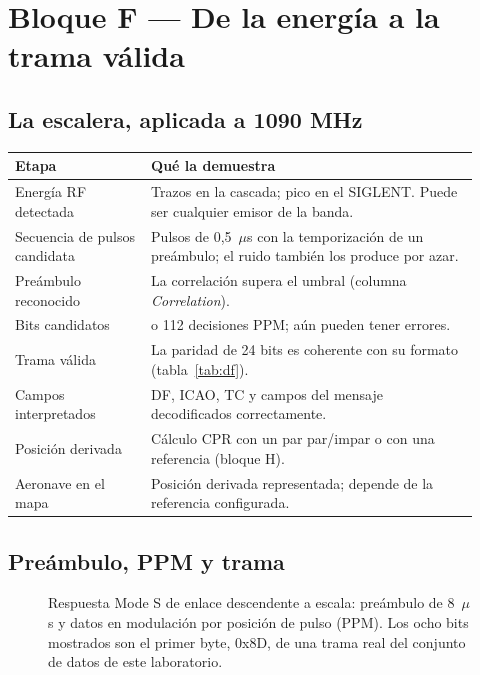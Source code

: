\section{Bloque F --- De la energía a la trama válida}
\label{sec:u-tramas}

\subsection{La escalera, aplicada a 1090 MHz}

\begin{longtable}{@{}>{\raggedright\arraybackslash}p{0.27\linewidth}>{\raggedright\arraybackslash}p{0.65\linewidth}@{}}
\toprule
\textbf{Etapa} & \textbf{Qué la demuestra} \\
\midrule
\endhead
Energía RF detectada & Trazos en la cascada; pico en el SIGLENT. Puede ser cualquier emisor de la banda. \\
Secuencia de pulsos candidata & Pulsos de 0,5~$\mu$s con la temporización de un preámbulo; el ruido también los produce por azar. \\
Preámbulo reconocido & La correlación supera el umbral (columna \emph{Correlation}). \\
Bits candidatos & 56 o 112 decisiones PPM; aún pueden tener errores. \\
Trama válida & La paridad de 24 bits es coherente con su formato (tabla~\ref{tab:df}). \\
Campos interpretados & DF, ICAO, TC y campos del mensaje decodificados correctamente. \\
Posición derivada & Cálculo CPR con un par par/impar o con una referencia (bloque H). \\
Aeronave en el mapa & Posición derivada representada; depende de la referencia configurada. \\
\bottomrule
\end{longtable}

\subsection{Preámbulo, PPM y trama}

\begin{figure}[H]
\centering
\resizebox{\linewidth}{!}{}
\caption{Respuesta Mode S de enlace descendente a escala: preámbulo de 8~$\mu$s y datos en modulación por posición de pulso (PPM). Los ocho bits mostrados son el primer byte, 0x8D, de una trama real del conjunto de datos de este laboratorio.}
\label{fig:trama}
\end{figure}

